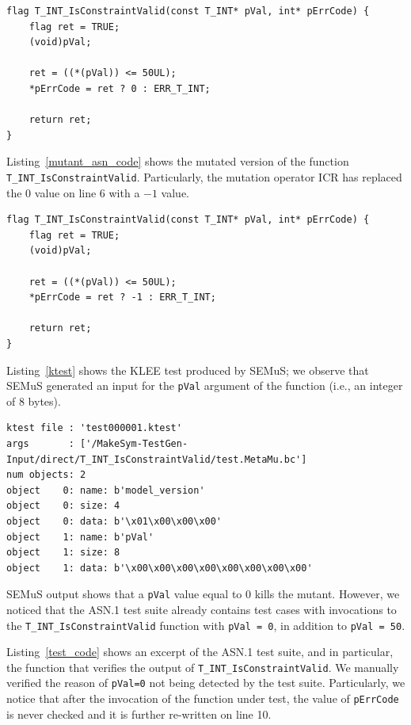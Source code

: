 \begin{lstlisting}[style=CStyle, float=t, caption=Original code for T\_INT\_IsConstraintValid., label=original_asn_code]
flag T_INT_IsConstraintValid(const T_INT* pVal, int* pErrCode) {
    flag ret = TRUE;
    (void)pVal;

    ret = ((*(pVal)) <= 50UL);
    *pErrCode = ret ? 0 : ERR_T_INT; 

    return ret;
}
\end{lstlisting}

Listing~\ref{mutant_asn_code} shows the mutated version of the function \texttt{T\_INT\_IsConstraintValid}. Particularly, the mutation operator ICR has replaced the $0$ value on line 6 with a $-1$ value.

\begin{lstlisting}[style=CStyle, float=t, caption=Mutant code for T\_INT\_IsConstraintValid., label=mutant_asn_code]
flag T_INT_IsConstraintValid(const T_INT* pVal, int* pErrCode) {
    flag ret = TRUE;
    (void)pVal;

    ret = ((*(pVal)) <= 50UL);
    *pErrCode = ret ? -1 : ERR_T_INT;

    return ret;
}
\end{lstlisting}


Listing~\ref{ktest} shows the KLEE test produced by SEMuS; we observe that SEMuS generated an input for the \texttt{pVal} argument of the function (i.e., an integer of 8 bytes).

\begin{lstlisting}[language={}, float=t, caption=Klee-test output, label=ktest]
ktest file : 'test000001.ktest'
args       : ['/MakeSym-TestGen-Input/direct/T_INT_IsConstraintValid/test.MetaMu.bc']
num objects: 2
object    0: name: b'model_version'
object    0: size: 4
object    0: data: b'\x01\x00\x00\x00'
object    1: name: b'pVal'
object    1: size: 8
object    1: data: b'\x00\x00\x00\x00\x00\x00\x00\x00'
\end{lstlisting}

SEMuS output shows that a \texttt{pVal} value equal to 0 kills the mutant. 
However, we noticed that the ASN.1 test suite already contains test cases with invocations to the \texttt{T\_INT\_IsConstraintValid} function with \texttt{pVal = 0}, in addition to \texttt{pVal = 50}.

Listing~\ref{test_code} shows an excerpt of the ASN.1 test suite, and in particular, the function that verifies the output of \texttt{T\_INT\_IsConstraintValid}. 
We manually verified the reason of \texttt{pVal=0} not being detected by the test suite. Particularly, we notice that after the invocation of the function under test, the value of \texttt{pErrCode} is never checked and it is further re-written on line 10. 

